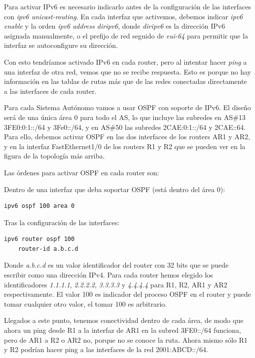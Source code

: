 \documentclass{article}
\begin{document}
Para activar IPv6 es necesario indicarlo antes de la configuración de las interfaces con \textit{ipv6 unicast-routing}. En cada interfaz que activemos, debemos indicar \textit{ipv6 enable} y la orden \textit{ipv6 address diripv6}, donde \textit{diripv6} es la dirección IPv6 asignada manualmente, o el prefijo de red seguido de \textit{eui-64} para permitir que la interfaz se autoconfigure su dirección.

Con esto tendríamos activado IPv6 en cada router, pero al intentar hacer \textit{ping} a una interfaz de otra red, vemos que no se recibe respuesta. Esto es porque no hay información en las tablas de rutas más que de las redes conectadas directamente a las interfaces de cada router.

Para cada Sistema Autónomo vamos a usar OSPF con soporte de IPv6. El diseño será de una única área 0 para todo el AS, lo que incluye las subredes en AS\#13 3FE0:0:1::/64 y 3Fe0::/64, y en AS\#50 las subredes 2CAE:0:1::/64 y 2CAE::64. Para ello, debemos activar OSPF en las dos interfaces de los routers AR1 y AR2, y en la interfaz FastEthernet1/0 de los routers R1 y R2 que se pueden ver en la figura de la topología más arriba.

Las órdenes para activar OSPF en cada router son:

Dentro de una interfaz que deba soportar OSPF (está dentro del área 0):
\begin{lstlisting}
ipv6 ospf 100 area 0
\end{lstlisting}

Tras la configuración de las interfaces:
\begin{lstlisting}
ipv6 router ospf 100
	router-id a.b.c.d
\end{lstlisting}

Donde \textit{a.b.c.d} es un valor identificador del router con 32 bits que se puede escribir como una dirección IPv4. Para cada router hemos elegido los identificadores \textit{1.1.1.1}, \textit{2.2.2.2}, \textit{3.3.3.3} y \textit{4.4.4.4} para R1, R2, AR1 y AR2 respectivamente. El valor 100 es indicador del proceso OSPF en el router y puede tomar cualquier otro valor, el tomar 100 es arbitrario.

Llegados a este punto, tenemos conectividad dentro de cada área, de modo que ahora un ping desde R1 a la interfaz de AR1 en la subred 3FE0::/64 funciona, pero de AR1 a R2 o AR2 no, porque no se conoce la ruta. Ahora mismo sólo R1 y R2 podrían hacer ping a las interfaces de la red 2001:ABCD::/64.
\end{document}
